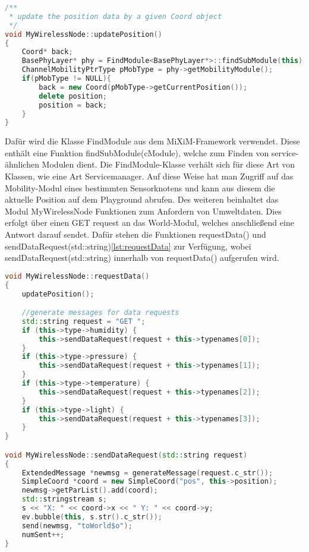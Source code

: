 \begin{minipage}{\textwidth}
\begin{lstlisting}[language=C++, label=lst:updatePosition]
/**
 * update the position data by a given Coord object
 */
void MyWirelessNode::updatePosition()
{
    Coord* back;
    BasePhyLayer* phy = FindModule<BasePhyLayer*>::findSubModule(this);
    ChannelMobilityPtrType pMobType = phy->getMobilityModule();
    if(pMobType != NULL){
        back = new Coord(pMobType->getCurrentPosition());
        delete position;
        position = back;
    }
}
\end{lstlisting}
\end{minipage}
Dafür wird die Klasse FindModule aus dem MiXiM-Framework verwendet. Diese enthält eine Funktion findSubModule(cModule), welche zum Finden von service-ähnlichen Modulen dient. Die FindModule-Klasse verhält sich für diese Art von Klassen, wie eine Art Servicemanager.\newline
Auf diese Weise hat man Zugriff auf das Mobility-Modul eines bestimmten Sensorknotens und kann aus diesem die aktuelle Position auf dem Playground abrufen.\newline
Des weiteren beinhaltet das Modul MyWirelessNode Funktionen zum Anfordern von Umweltdaten. Dies erfolgt über einen GET request an das World-Modul, welches anschließend eine Antwort darauf sendet. Dafür stehen die Funktionen requestData() und sendDataRequest(std::string)\ref{lst:requestData} zur Verfügung, wobei sendDataRequest(std::string) innerhalb von requestData() aufgerufen wird.
\begin{lstlisting}[language=C++, label=lst:requestData]
void MyWirelessNode::requestData()
{
    updatePosition();

    //generate messages for data requests
    std::string request = "GET ";
    if (this->type->humidity) {
        this->sendDataRequest(request + this->typenames[0]);
    }
    if (this->type->pressure) {
        this->sendDataRequest(request + this->typenames[1]);
    }
    if (this->type->temperature) {
        this->sendDataRequest(request + this->typenames[2]);
    }
    if (this->type->light) {
        this->sendDataRequest(request + this->typenames[3]);
    }
}

void MyWirelessNode::sendDataRequest(std::string request)
{
    ExtendedMessage *newmsg = generateMessage(request.c_str());
    SimpleCoord *coord = new SimpleCoord("pos", this->position);
    newmsg->getParList().add(coord);
    std::stringstream s;
    s << "X: " << coord->x << " Y: " << coord->y;
    ev.bubble(this, s.str().c_str());
    send(newmsg, "toWorld$o");
    numSent++;
}
\end{lstlisting}

